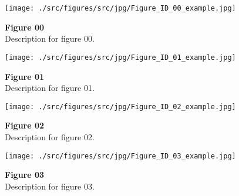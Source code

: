 
\begin{figure*}[p]
    \centering
    \texttt{[image: ./src/figures/src/jpg/Figure\_ID\_00\_example.jpg]}
    \caption{
\textbf{
Figure 00
}
\smallskip
\\
Description for figure 00.
}
    \label{fig:00_example}
\end{figure*}

\clearpage
\begin{figure*}[p]
    \centering
    \texttt{[image: ./src/figures/src/jpg/Figure\_ID\_01\_example.jpg]}
    \caption{
\textbf{
Figure 01
}
\smallskip
\\
Description for figure 01.
}
    \label{fig:01_example}
\end{figure*}

\clearpage
\begin{figure*}[p]
    \centering
    \texttt{[image: ./src/figures/src/jpg/Figure\_ID\_02\_example.jpg]}
    \caption{
\textbf{
Figure 02
}
\smallskip
\\
Description for figure 02.
}
    \label{fig:02_example}
\end{figure*}

\clearpage
\begin{figure*}[p]
    \centering
    \texttt{[image: ./src/figures/src/jpg/Figure\_ID\_03\_example.jpg]}
    \caption{
\textbf{
Figure 03
}
\smallskip
\\
Description for figure 03.
}
    \label{fig:03_example}
\end{figure*}

